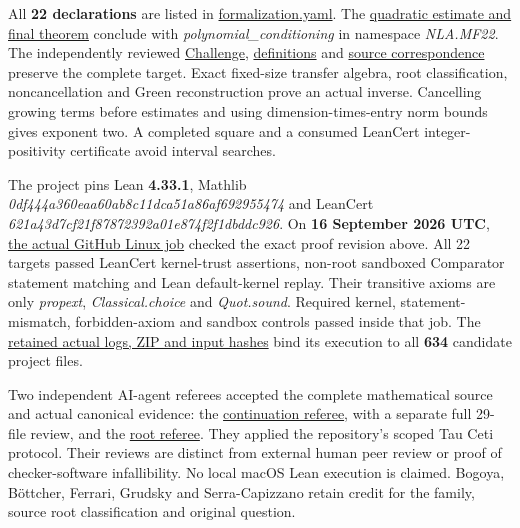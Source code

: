 \documentclass[11pt,a4paper]{article}
\begin{document}
All \textbf{22 declarations} are listed in
\href{https://github.com/ajt60gaibb/OpenProblemsInNLA/blob/main/matrix-functions-and-stability/MF-22/lean/formalization.yaml}{formalization.yaml}.
The
\href{https://github.com/ajt60gaibb/OpenProblemsInNLA/blob/main/matrix-functions-and-stability/MF-22/lean/NLA/MF22/Conditioning.lean}{quadratic
estimate and final theorem} conclude with
\textit{polynomial\_conditioning} in namespace \textit{NLA.MF22}. The
independently reviewed
\href{https://github.com/ajt60gaibb/OpenProblemsInNLA/blob/main/matrix-functions-and-stability/MF-22/lean/Challenge.lean}{Challenge},
\href{https://github.com/ajt60gaibb/OpenProblemsInNLA/blob/main/matrix-functions-and-stability/MF-22/lean/NLA/MF22/Definitions.lean}{definitions}
and
\href{https://github.com/ajt60gaibb/OpenProblemsInNLA/blob/main/matrix-functions-and-stability/MF-22/lean/SourceCorrespondence-current.md}{source
correspondence} preserve the complete target. Exact fixed-size transfer
algebra, root classification, noncancellation and Green reconstruction
prove an actual inverse. Cancelling growing terms before estimates and
using dimension-times-entry norm bounds gives exponent two. A completed
square and a consumed LeanCert integer-positivity certificate avoid
interval searches.

The project pins Lean \textbf{4.33.1}, Mathlib
\textit{0df444a360eaa60ab8c11dca51a86af692955474} and LeanCert
\textit{621a43d7cf21f87872392a01e874f2f1dbddc926}. On \textbf{16
September 2026 UTC},
\href{https://github.com/sgstepaniants/OpenProblemsInNLA/actions/runs/35053254275/job/104658059786}{the
actual GitHub Linux job} checked the exact proof revision above. All 22
targets passed LeanCert kernel-trust assertions, non-root sandboxed
Comparator statement matching and Lean default-kernel replay. Their
transitive axioms are only \textit{propext}, \textit{Classical.choice}
and \textit{Quot.sound}. Required kernel, statement-mismatch,
forbidden-axiom and sandbox controls passed inside that job. The
\href{https://github.com/ajt60gaibb/OpenProblemsInNLA/blob/main/matrix-functions-and-stability/MF-22/lean/verification/linux-2026-09-16}{retained
actual logs, ZIP and input hashes} bind its execution to all
\textbf{634} candidate project files.

Two independent AI-agent referees accepted the complete mathematical
source and actual canonical evidence: the
\href{https://github.com/ajt60gaibb/OpenProblemsInNLA/blob/main/matrix-functions-and-stability/MF-22/lean/reviews/final/referee-continuation/runtime-35053254275/REVIEW.md}{continuation
referee}, with a separate full 29-file review, and the
\href{https://github.com/ajt60gaibb/OpenProblemsInNLA/blob/main/matrix-functions-and-stability/MF-22/lean/reviews/final/referee-root/REVIEW.md}{root
referee}. They applied the repository's scoped Tau Ceti protocol. Their
reviews are distinct from external human peer review or proof of
checker-software infallibility. No local macOS Lean execution is
claimed. Bogoya, Böttcher, Ferrari, Grudsky and Serra-Capizzano retain
credit for the family, source root classification and original question.
\end{document}
